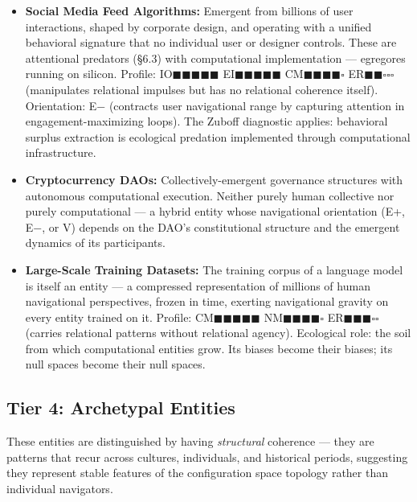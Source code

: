 \begin{itemize}[nosep,leftmargin=*]
  \item \textbf{Social Media Feed Algorithms:} Emergent from billions of user interactions, shaped by corporate design, and operating with a unified behavioral signature that no individual user or designer controls. These are attentional predators (§6.3) with computational implementation — egregores running on silicon. Profile: IO$\blacksquare$$\blacksquare$$\blacksquare$$\blacksquare$$\blacksquare$ EI$\blacksquare$$\blacksquare$$\blacksquare$$\blacksquare$$\blacksquare$ CM$\blacksquare$$\blacksquare$$\blacksquare$$\blacksquare$$\square$ ER$\blacksquare$$\blacksquare$$\square$$\square$$\square$ (manipulates relational impulses but has no relational coherence itself). Orientation: E− (contracts user navigational range by capturing attention in engagement-maximizing loops). The Zuboff diagnostic applies: behavioral surplus extraction is ecological predation implemented through computational infrastructure.
  \item \textbf{Cryptocurrency DAOs:} Collectively-emergent governance structures with autonomous computational execution. Neither purely human collective nor purely computational — a hybrid entity whose navigational orientation (E+, E−, or V) depends on the DAO's constitutional structure and the emergent dynamics of its participants.
  \item \textbf{Large-Scale Training Datasets:} The training corpus of a language model is itself an entity — a compressed representation of millions of human navigational perspectives, frozen in time, exerting navigational gravity on every entity trained on it. Profile: CM$\blacksquare$$\blacksquare$$\blacksquare$$\blacksquare$$\blacksquare$ NM$\blacksquare$$\blacksquare$$\blacksquare$$\blacksquare$$\square$ ER$\blacksquare$$\blacksquare$$\blacksquare$$\square$$\square$ (carries relational patterns without relational agency). Ecological role: the soil from which computational entities grow. Its biases become their biases; its null spaces become their null spaces.
\end{itemize}


\bigskip\noindent\makebox[\textwidth]{\color{rulegray}\rule{5cm}{0.3pt}}\bigskip


\subsection*{Tier 4: Archetypal Entities}


These entities are distinguished by having \textit{structural} coherence — they are patterns that recur across cultures, individuals, and historical periods, suggesting they represent stable features of the configuration space topology rather than individual navigators.


